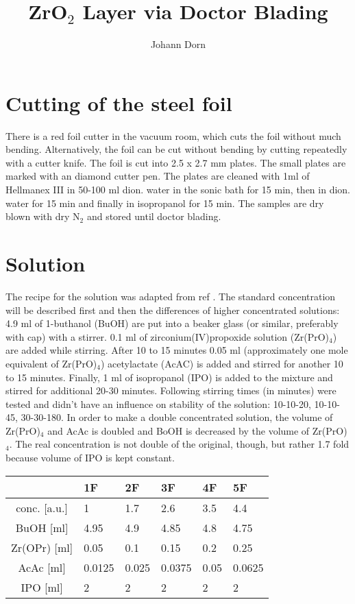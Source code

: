\documentclass[a4paper]{article}
\title{ZrO$_2$ Layer via Doctor Blading }
\author{Johann Dorn}
\begin{document}
\maketitle
\iffalse
my notes
\fi
\justify

\section{Cutting of the steel foil}
\label{sec:cut}
There is a red foil cutter in the vacuum room, which cuts the foil without much bending.
Alternatively, the foil can be cut without bending by cutting repeatedly with a cutter knife.
The foil is cut into 2.5 x 2.7 mm plates.
The small plates are marked with an diamond cutter pen.
The plates are cleaned with 1ml of Hellmanex III in 50-100 ml dion. water in the sonic bath for 15 min, then in dion. water for 15 min and finally in isopropanol for 15 min. 
The samples are dry blown with dry N$_2$ and stored until doctor blading.

\section{Solution}
\label{sec:sol}
The recipe for the solution was adapted from ref \cite{Hu2016}.
The standard concentration will be described first and then the differences of higher concentrated solutions:
4.9 ml of 1-buthanol (BuOH) are put into a beaker glass (or similar, preferably with cap) with a stirrer. 
0.1 ml of zirconium(IV)propoxide solution (Zr(PrO)$_4$) are added while stirring.  
After 10 to 15 minutes 0.05 ml (approximately one mole equivalent of Zr(PrO)$_4$) acetylactate (AcAC) is added and stirred for another 10 to 15 minutes. 
Finally, 1 ml of isopropanol (IPO) is added to the mixture and stirred for additional 20-30 minutes. 
Following stirring times (in minutes) were tested and didn't have an influence on stability of the solution: 10-10-20, 10-10-45, 30-30-180. 
In order to make a double concentrated solution, the volume of Zr(PrO)$_4$ and AcAc is doubled and BoOH is decreased by the volume of Zr(PrO)$_4$. 
The real concentration is not double of the original, though, but rather 1.7 fold because volume of IPO is kept constant.

\begin{table}[h]
	\centering
	\begin{tabular}{clllll}
		\hline
				&1F		&2F		&3F		&4F		&5F		\\
		\hline
		conc. [a.u.]	&1		&1.7	&2.6	&3.5	&4.4	\\
		\hline
		BuOH [ml]		&4.95	&4.9	&4.85	&4.8	&4.75	\\
		Zr(OPr) [ml]	&0.05	&0.1	&0.15	&0.2	&0.25	\\
		AcAc [ml]		&0.0125	&0.025	&0.0375	&0.05	&0.0625	\\
		IPO [ml]		&2		&2		&2		&2		&2		\\
		\hline
	\end{tabular}
\end{table}
\end{document}
